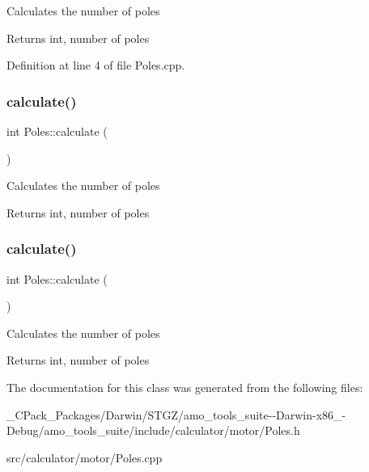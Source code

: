 Calculates the number of poles \begin{DoxyReturn}{Returns}
int, number of poles 
\end{DoxyReturn}


Definition at line 4 of file Poles.\+cpp.

\mbox{\label{class_poles_a23988f68100374c8277dca81ab06f724}} 
\subsubsection{\texorpdfstring{calculate()}{calculate()}\hspace{0.1cm}{\footnotesize\ttfamily [2/3]}}
{\footnotesize\ttfamily int Poles\+::calculate (\begin{DoxyParamCaption}{ }\end{DoxyParamCaption})}

Calculates the number of poles \begin{DoxyReturn}{Returns}
int, number of poles 
\end{DoxyReturn}
\mbox{\label{class_poles_a23988f68100374c8277dca81ab06f724}} 
\subsubsection{\texorpdfstring{calculate()}{calculate()}\hspace{0.1cm}{\footnotesize\ttfamily [3/3]}}
{\footnotesize\ttfamily int Poles\+::calculate (\begin{DoxyParamCaption}{ }\end{DoxyParamCaption})}

Calculates the number of poles \begin{DoxyReturn}{Returns}
int, number of poles 
\end{DoxyReturn}


The documentation for this class was generated from the following files\+:\begin{DoxyCompactItemize}
\item 
\+\_\+\+C\+Pack\+\_\+\+Packages/\+Darwin/\+S\+T\+G\+Z/amo\+\_\+tools\+\_\+suite-\/-\/\+Darwin-\/x86\+\_-\/\+Debug/amo\+\_\+tools\+\_\+suite/include/calculator/motor/Poles.\+h\item 
src/calculator/motor/Poles.\+cpp\end{DoxyCompactItemize}
